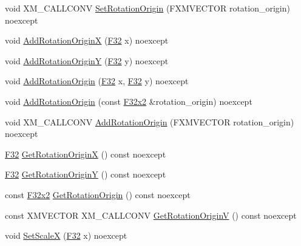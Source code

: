 \begin{DoxyCompactItemize}
\item 
void X\+M\+\_\+\+C\+A\+L\+L\+C\+O\+NV \hyperlink{classmage_1_1_texture_transform_a41aebcbc263a678157081986a72f52af}{Set\+Rotation\+Origin} (F\+X\+M\+V\+E\+C\+T\+OR rotation\+\_\+origin) noexcept
\item 
void \hyperlink{classmage_1_1_texture_transform_a591aacd1662da3de581d440d921a99df}{Add\+Rotation\+OriginX} (\hyperlink{namespacemage_aa97e833b45f06d60a0a9c4fc22ae02c0}{F32} x) noexcept
\item 
void \hyperlink{classmage_1_1_texture_transform_a5d3dd574b9471f4ae1162819abc394bf}{Add\+Rotation\+OriginY} (\hyperlink{namespacemage_aa97e833b45f06d60a0a9c4fc22ae02c0}{F32} y) noexcept
\item 
void \hyperlink{classmage_1_1_texture_transform_a2ad2af24299e50c43b9f8ac459544f31}{Add\+Rotation\+Origin} (\hyperlink{namespacemage_aa97e833b45f06d60a0a9c4fc22ae02c0}{F32} x, \hyperlink{namespacemage_aa97e833b45f06d60a0a9c4fc22ae02c0}{F32} y) noexcept
\item 
void \hyperlink{classmage_1_1_texture_transform_a1a4009b46ef0cab66dd77bf0dc842142}{Add\+Rotation\+Origin} (const \hyperlink{namespacemage_aa87237ad091f5cd7da612b8523fc108f}{F32x2} \&rotation\+\_\+origin) noexcept
\item 
void X\+M\+\_\+\+C\+A\+L\+L\+C\+O\+NV \hyperlink{classmage_1_1_texture_transform_a67e287acb98ea8aeeda4e3466859c8b6}{Add\+Rotation\+Origin} (F\+X\+M\+V\+E\+C\+T\+OR rotation\+\_\+origin) noexcept
\item 
\hyperlink{namespacemage_aa97e833b45f06d60a0a9c4fc22ae02c0}{F32} \hyperlink{classmage_1_1_texture_transform_a8cf3f245042d98a135b5d12ae590b2b2}{Get\+Rotation\+OriginX} () const noexcept
\item 
\hyperlink{namespacemage_aa97e833b45f06d60a0a9c4fc22ae02c0}{F32} \hyperlink{classmage_1_1_texture_transform_a2efe9088ae3532b188bab7c5b27238e6}{Get\+Rotation\+OriginY} () const noexcept
\item 
const \hyperlink{namespacemage_aa87237ad091f5cd7da612b8523fc108f}{F32x2} \hyperlink{classmage_1_1_texture_transform_a22ace56e39d1987fb0d46982536121fe}{Get\+Rotation\+Origin} () const noexcept
\item 
const X\+M\+V\+E\+C\+T\+OR X\+M\+\_\+\+C\+A\+L\+L\+C\+O\+NV \hyperlink{classmage_1_1_texture_transform_a62a64589318d6cdc6792f732a34468a1}{Get\+Rotation\+OriginV} () const noexcept
\item 
void \hyperlink{classmage_1_1_texture_transform_ae038a7bf4d879c67e898db1fc8093900}{Set\+ScaleX} (\hyperlink{namespacemage_aa97e833b45f06d60a0a9c4fc22ae02c0}{F32} x) noexcept

\end{DoxyCompactItemize}
